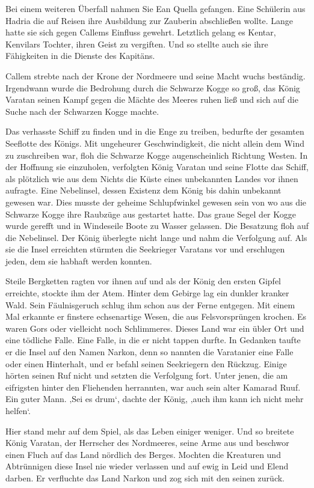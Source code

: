 \documentclass[10pt, a4paper, oneside]{book}
\begin{document}
\begin{multicols}{2}
Bei einem weiteren Überfall nahmen Sie Ean Quella gefangen. Eine Schülerin aus Hadria die auf Reisen ihre Ausbildung zur Zauberin abschließen wollte. Lange hatte sie sich gegen Callems Einfluss gewehrt. Letztlich gelang es Kentar, Kenvilars Tochter, ihren Geist zu vergiften. Und so stellte auch sie ihre Fähigkeiten in die Dienste des Kapitäns.\bigskip

Callem strebte nach der Krone der Nordmeere und seine Macht wuchs beständig. Irgendwann wurde die Bedrohung durch die Schwarze Kogge so groß, das König Varatan seinen Kampf gegen die Mächte des Meeres ruhen ließ und sich auf die Suche nach der Schwarzen Kogge machte.

Das verhasste Schiff zu finden und in die Enge zu treiben, bedurfte der gesamten  Seeflotte des Königs. Mit ungeheurer Geschwindigkeit, die nicht allein dem Wind zu zuschreiben war, floh die Schwarze Kogge augenscheinlich Richtung Westen. In der Hoffnung sie einzuholen, verfolgten König Varatan und seine Flotte das Schiff, als plötzlich wie aus dem Nichts die Küste eines unbekannten Landes vor ihnen aufragte. Eine Nebelinsel, dessen Existenz dem König bis dahin unbekannt gewesen war. Dies musste der geheime Schlupfwinkel gewesen sein von wo aus die Schwarze Kogge ihre Raubzüge aus gestartet hatte. Das graue Segel der Kogge wurde gerefft und in Windeseile Boote zu Wasser gelassen. Die Besatzung floh auf die Nebelinsel. Der König überlegte nicht lange und nahm die Verfolgung auf. Als sie die Insel erreichten stürmten die Seekrieger Varatans vor und erschlugen jeden, dem sie habhaft werden konnten.\bigskip

Steile Bergketten ragten vor ihnen auf und als der König den ersten Gipfel erreichte, stockte ihm der Atem. Hinter dem Gebirge lag ein dunkler kranker Wald. Sein Fäulnisgeruch schlug ihm schon aus der Ferne entgegen. Mit einem Mal erkannte er finstere echsenartige Wesen, die aus Felsvorsprüngen krochen. Es waren Gors oder vielleicht noch Schlimmeres. Dieses Land war ein übler Ort und eine tödliche Falle. Eine Falle, in die er nicht tappen durfte. In Gedanken taufte er die Insel auf den Namen Narkon, denn so nannten die Varatanier eine Falle oder einen Hinterhalt, und er befahl seinen Seekriegern den Rückzug. Einige hörten seinen Ruf nicht und setzten die Verfolgung fort. Unter jenen, die am eifrigsten hinter den Fliehenden herrannten, war auch sein alter Kamarad Ruuf. Ein guter Mann. ‚Sei es drum‘, dachte der König, ‚auch ihm kann ich nicht mehr helfen‘.

Hier stand mehr auf dem Spiel, als das Leben einiger weniger. Und so breitete König Varatan, der Herrscher des Nordmeeres, seine Arme aus und beschwor einen Fluch auf das Land nördlich des Berges. Mochten die Kreaturen und Abtrünnigen diese Insel nie wieder verlassen und auf ewig in Leid und Elend darben. Er verfluchte das Land Narkon und zog sich mit den seinen zurück.\bigskip


\end{multicols}
\end{document}
